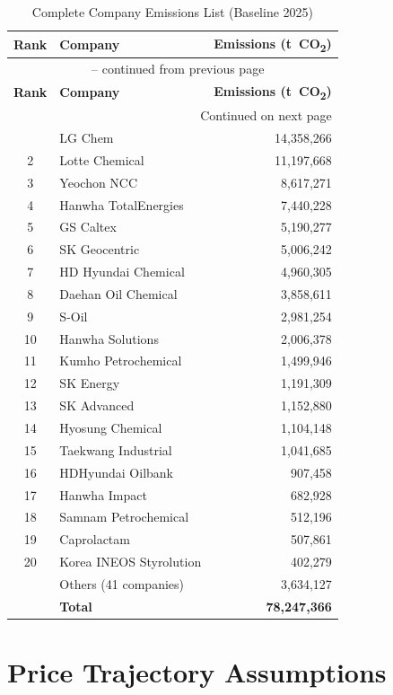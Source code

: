 \documentclass[12pt,a4paper]{article}
\newcommand{\COtwo}{CO\textsubscript{2}}
\begin{document}
\begin{longtable}{@{}clr@{}}
\caption{Complete Company Emissions List (Baseline 2025)} \label{tab:all_companies} \\
\toprule
\textbf{Rank} & \textbf{Company} & \textbf{Emissions (t~\COtwo)} \\
\midrule
\endfirsthead
\multicolumn{3}{c}{\tablename\ \thetable{} -- continued from previous page} \\
\toprule
\textbf{Rank} & \textbf{Company} & \textbf{Emissions (t~\COtwo)} \\
\midrule
\endhead
\midrule
\multicolumn{3}{r}{Continued on next page} \\
\endfoot
\bottomrule
\endlastfoot
1 & LG Chem & 14,358,266 \\
2 & Lotte Chemical & 11,197,668 \\
3 & Yeochon NCC & 8,617,271 \\
4 & Hanwha TotalEnergies & 7,440,228 \\
5 & GS Caltex & 5,190,277 \\
6 & SK Geocentric & 5,006,242 \\
7 & HD Hyundai Chemical & 4,960,305 \\
8 & Daehan Oil Chemical & 3,858,611 \\
9 & S-Oil & 2,981,254 \\
10 & Hanwha Solutions & 2,006,378 \\
11 & Kumho Petrochemical & 1,499,946 \\
12 & SK Energy & 1,191,309 \\
13 & SK Advanced & 1,152,880 \\
14 & Hyosung Chemical & 1,104,148 \\
15 & Taekwang Industrial & 1,041,685 \\
16 & HDHyundai Oilbank & 907,458 \\
17 & Hanwha Impact & 682,928 \\
18 & Samnam Petrochemical & 512,196 \\
19 & Caprolactam & 507,861 \\
20 & Korea INEOS Styrolution & 402,279 \\
& Others (41 companies) & 3,634,127 \\
\midrule
& \textbf{Total} & \textbf{78,247,366} \\
\end{longtable}

\section{Price Trajectory Assumptions}
\end{document}
